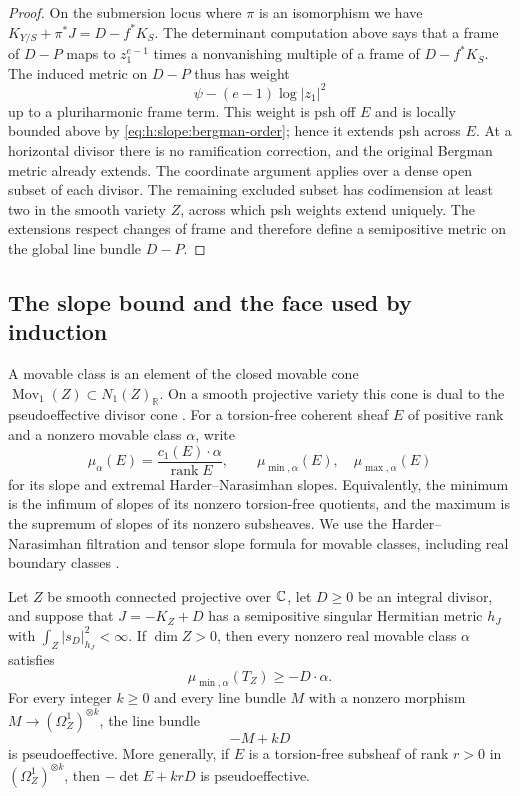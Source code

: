 \begin{proof}
On the submersion locus where $\pi$ is an isomorphism we have
$K_{Y/S}+\pi^*J=D-f^*K_S$.  The determinant computation above says
that a frame of $D-P$ maps to $z_1^{e-1}$ times a nonvanishing multiple
of a frame of $D-f^*K_S$.  The induced metric on $D-P$ thus has weight
\[
                         \psi-(e-1)\log|z_1|^2
\]
up to a pluriharmonic frame term.  This weight is psh off $E$ and is
locally bounded above by \eqref{eq:h:slope:bergman-order}; hence it
extends psh across $E$.  At a horizontal divisor there is no
ramification correction, and the original Bergman metric already
extends.  The coordinate argument applies over a dense open subset
of each divisor.  The remaining excluded subset has codimension at
least two in the smooth variety $Z$, across which psh weights extend
uniquely.  The extensions respect changes of frame and therefore
define a semipositive metric on the global line bundle $D-P$.
\end{proof}

\subsection{The slope bound and the face used by induction}

A movable class is an element of the closed movable cone
$\operatorname{Mov}_1(Z)\subset N_1(Z)_{\mathbb R}$.  On a smooth
projective variety this cone is dual to the pseudoeffective divisor
cone \cite{BDPP2013}.  For a torsion-free coherent sheaf $E$ of
positive rank and a nonzero movable class $\alpha$, write
\[
 \mu_\alpha(E)=\frac{c_1(E)\cdot\alpha}{\operatorname{rank}E},
 \qquad \mu_{\min,\alpha}(E),\quad\mu_{\max,\alpha}(E)
\]
for its slope and extremal Harder--Narasimhan slopes.  Equivalently,
the minimum is the infimum of slopes of its nonzero torsion-free
quotients, and the maximum is the supremum of slopes of its nonzero
subsheaves.  We use the Harder--Narasimhan filtration and tensor slope
formula for movable classes, including real boundary classes
\cite[Corollary~2.27 and Theorem~4.2]{GKP2016}.

\begin{theorem}
\label{h:slope:cotangent}\label{thm:finite-volume-slope}
Let $Z$ be smooth connected projective over $\mathbb C$, let $D\ge0$ be
an integral divisor, and suppose that $J=-K_Z+D$ has a semipositive
singular Hermitian metric $h_J$ with $\int_Z|s_D|_{h_J}^2<\infty$.
If $\dim Z>0$,
then every nonzero real movable class $\alpha$ satisfies
\begin{equation}\label{eq:h:slope:min}
                  \mu_{\min,\alpha}(T_Z)\geq-D\cdot\alpha.
\end{equation}
For every integer $k\geq0$ and every line bundle $M$ with a nonzero
morphism $M\to(\Omega_Z^1)^{\otimes k}$, the line bundle
\begin{equation}\label{eq:h:slope:line}
                             -M+kD
\end{equation}
is pseudoeffective.  More generally, if $E$ is a torsion-free subsheaf
of rank $r>0$ in $(\Omega_Z^1)^{\otimes k}$, then
$-\det E+krD$ is pseudoeffective.
\end{theorem}

